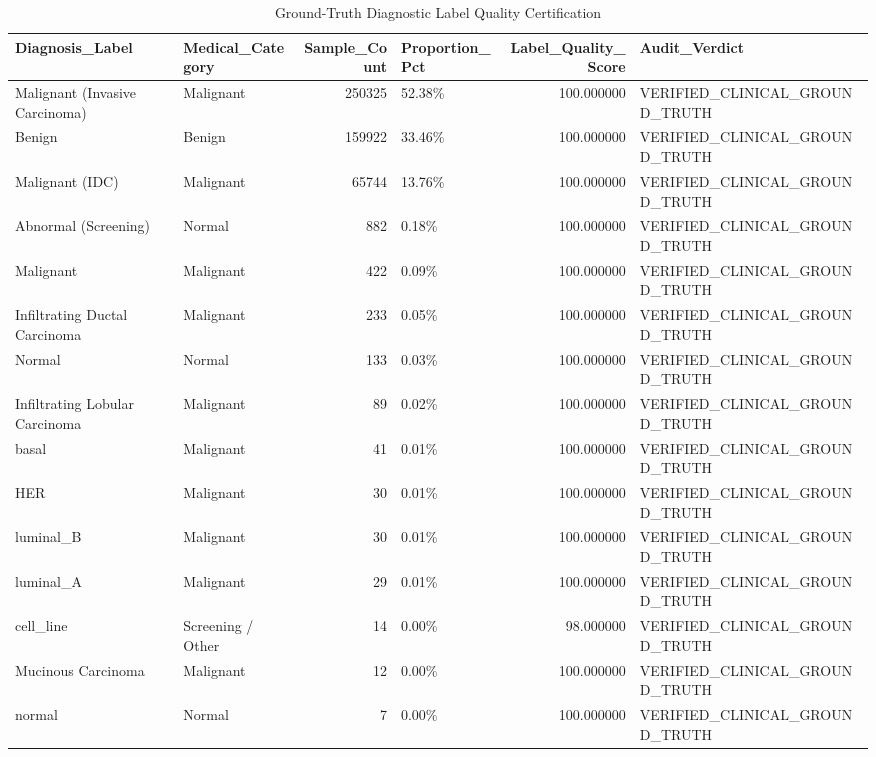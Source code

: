 \begin{table}
\caption{Ground-Truth Diagnostic Label Quality Certification}
\label{tab:table_label_validation}
\begin{tabular}{llrlrl}
\toprule
Diagnosis\_Label & Medical\_Category & Sample\_Count & Proportion\_Pct & Label\_Quality\_Score & Audit\_Verdict \\
\midrule
Malignant (Invasive Carcinoma) & Malignant & 250325 & 52.38\% & 100.000000 & VERIFIED\_CLINICAL\_GROUND\_TRUTH \\
Benign & Benign & 159922 & 33.46\% & 100.000000 & VERIFIED\_CLINICAL\_GROUND\_TRUTH \\
Malignant (IDC) & Malignant & 65744 & 13.76\% & 100.000000 & VERIFIED\_CLINICAL\_GROUND\_TRUTH \\
Abnormal (Screening) & Normal & 882 & 0.18\% & 100.000000 & VERIFIED\_CLINICAL\_GROUND\_TRUTH \\
Malignant & Malignant & 422 & 0.09\% & 100.000000 & VERIFIED\_CLINICAL\_GROUND\_TRUTH \\
Infiltrating Ductal Carcinoma & Malignant & 233 & 0.05\% & 100.000000 & VERIFIED\_CLINICAL\_GROUND\_TRUTH \\
Normal & Normal & 133 & 0.03\% & 100.000000 & VERIFIED\_CLINICAL\_GROUND\_TRUTH \\
Infiltrating Lobular Carcinoma & Malignant & 89 & 0.02\% & 100.000000 & VERIFIED\_CLINICAL\_GROUND\_TRUTH \\
basal & Malignant & 41 & 0.01\% & 100.000000 & VERIFIED\_CLINICAL\_GROUND\_TRUTH \\
HER & Malignant & 30 & 0.01\% & 100.000000 & VERIFIED\_CLINICAL\_GROUND\_TRUTH \\
luminal\_B & Malignant & 30 & 0.01\% & 100.000000 & VERIFIED\_CLINICAL\_GROUND\_TRUTH \\
luminal\_A & Malignant & 29 & 0.01\% & 100.000000 & VERIFIED\_CLINICAL\_GROUND\_TRUTH \\
cell\_line & Screening / Other & 14 & 0.00\% & 98.000000 & VERIFIED\_CLINICAL\_GROUND\_TRUTH \\
Mucinous Carcinoma & Malignant & 12 & 0.00\% & 100.000000 & VERIFIED\_CLINICAL\_GROUND\_TRUTH \\
normal & Normal & 7 & 0.00\% & 100.000000 & VERIFIED\_CLINICAL\_GROUND\_TRUTH \\
\bottomrule
\end{tabular}
\end{table}

